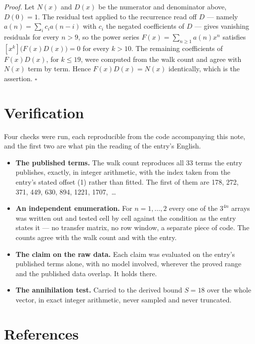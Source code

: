 \documentclass[11pt]{article}
\theoremstyle{definition}
\begin{document}
{\itshape Proof.} Let $N(x)$ and $D(x)$ be the numerator and denominator above, $D(0)=1$. The residual test applied to the recurrence read off $D$ --- namely $a(n) = \sum_i c_i a(n-i)$ with $c_i$ the negated coefficients of $D$ --- gives vanishing residuals for every $n > 9$, so the power series $F(x)=\sum_{n\ge 1}a(n)x^n$ satisfies $[x^k]\bigl(F(x)D(x)\bigr) = 0$ for every $k > 10$. The remaining coefficients of $F(x)D(x)$, for $k \le 19$, were computed from the walk count and agree with $N(x)$ term by term. Hence $F(x)D(x) = N(x)$ identically, which is the assertion. $\square$

\section{Verification}

Four checks were run, each reproducible from the code accompanying this note, and the first two are what pin the reading of the entry's English.

\begin{itemize}

\item {\bfseries The published terms.} The walk count reproduces all 33 terms the entry publishes, exactly, in integer arithmetic, with the index taken from the entry's stated offset (1) rather than fitted. The first of them are 178, 272, 371, 449, 630, 894, 1221, 1707,~\dots

\item {\bfseries An independent enumeration.} For $n = 1,\dots,2$ every one of the $3^{4n}$ arrays was written out and tested cell by cell against the condition as the entry states it --- no transfer matrix, no row window, a separate piece of code. The counts agree with the walk count and with the entry.

\item {\bfseries The claim on the raw data.} Each claim was evaluated on the entry's published terms alone, with no model involved, wherever the proved range and the published data overlap. It holds there.

\item {\bfseries The annihilation test.} Carried to the derived bound $S = 18$ over the whole vector, in exact integer arithmetic, never sampled and never truncated.

\end{itemize}

\section{References}
\end{document}
